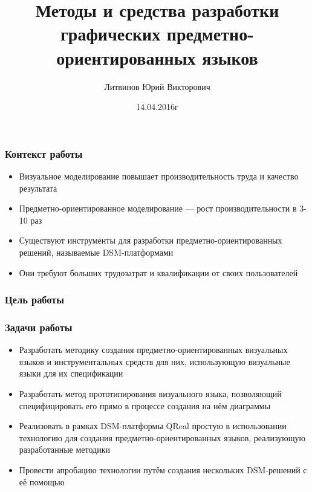\documentclass[14pt]{beamer}
\author{Литвинов Юрий Викторович}
\title{Методы и средства разработки графических предметно-ориентированных языков}
\institute{Санкт-Петербургский государственный университет}
\date{14.04.2016г}
\begin{document}
{
\begin{frame}
    \titlepage
\end{frame}
}

\begin{frame}
    \frametitle{Контекст работы}
    \begin{itemize}
        \item Визуальное моделирование повышает производительность труда 
        и качество результата
        \item Предметно-ориентированное моделирование --- рост производительности в 3-10 раз
        \item Существуют инструменты для разработки предметно-ориентированных решений,
             называемые DSM-платформами
        \item Они требуют больших трудозатрат и квалификации от своих пользователей
    \end{itemize}
\end{frame}

\begin{frame}
    \frametitle{Цель работы}
    \vspace*{2cm}
\end{frame}

\begin{frame}
    \frametitle{Задачи работы}
    \begin{small}
        \begin{itemize}
            \item Разработать методику создания предметно-ориентированных визуальных языков 
                и инструментальных средств для них, использующую визуальные языки
                для их спецификации
            \item Разработать метод прототипирования визуального языка, позволяющий 
                специфицировать его прямо в процессе создания на нём диаграммы
            \item Реализовать в рамках DSM-платформы QReal простую в использовании 
                технологию для создания предметно-ориентированных языков, реализующую
                разработанные методики
            \item Провести апробацию технологии путём создания нескольких DSM-решений с
                её помощью        
        \end{itemize}
    \end{small}
\end{frame}
\end{document}
